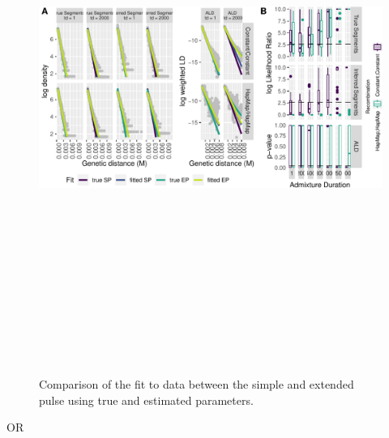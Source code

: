 \documentclass[11pt]{article}
\begin{document}
\begin{figure}
\centering
\includegraphics[width=16cm,height=18cm,keepaspectratio]{ATE_Revisions_files/figure-latex/figResult2_2and3-1.pdf}
\caption{\label{fig:fig3_2} Comparison of the fit to data between the simple and extended pulse using true and estimated parameters. }
\end{figure}

OR
\end{document}
